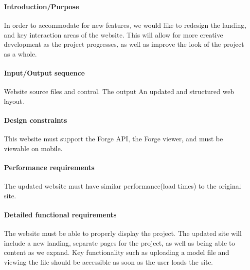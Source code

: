 \documentclass[letterpaper, 10pt, draftclsnofoot, compsoc, onecolumn]{IEEEtran}
\begin{document}

\subsubsection[{Website Redesign}]{\rmfamily\bfseries\color{black} }

\paragraph[Introduction/Purpose of this
feature]{\rmfamily\bfseries\color{black}
Introduction/Purpose }
{\color{black}
	In order to accommodate for new features, we would like to redesign the landing, and key interaction areas of the website. 
	This will allow for more creative development as the project progresses, as well as improve the look of the project as a whole.
}

\paragraph[Input/Output sequence]{\rmfamily\bfseries\color{black}
Input/Output sequence }
{\color{black}
	Website source files and control. The output An updated and structured web layout.
}

\paragraph[Design constraints]{\rmfamily\bfseries\color{black} Design
constraints }
{\color{black}
	This website must support the Forge API, the Forge viewer, and must be viewable on mobile. 
}

\paragraph[Performance requirements]{\rmfamily\bfseries\color{black}
Performance requirements }
{\color{black}
	The updated website must have similar performance(load times) to the original site.
}

\paragraph[Detailed functional requirements]{\rmfamily\bfseries\color{black}
Detailed functional requirements }
{\color{black}
	The website must be able to properly display the project. The updated site will include a new landing,
	separate pages for the project, as well as being able to content as we expand. Key functionality such as uploading
	a model file and viewing the file should be accessible as soon as the user loads the site.   
}
\end{document}
